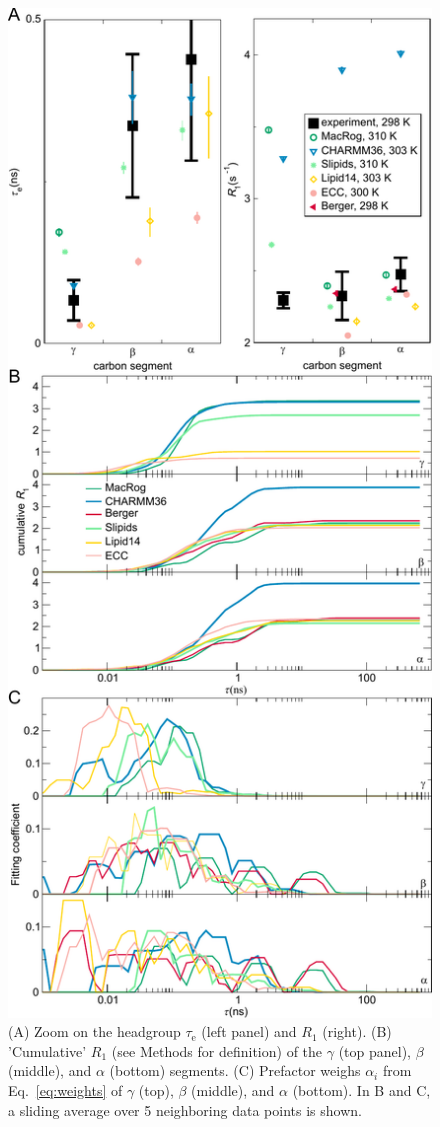 \documentclass[journal=jpcbfk,manuscript=article,layout=twocolumn]{achemso}
\begin{document}
\begin{figure}[!h]
\centering
\includegraphics[width=\columnwidth]{../Figs/R1_and_comp.pdf}
\caption{
(A) Zoom on the headgroup $\tau_\mathrm e$ (left panel) and $R_1$ (right).
(B) 'Cumulative' $R_1$ (see Methods for definition) of the
$\gamma$ (top panel), $\beta$ (middle), and $\alpha$ (bottom) segments.
(C) Prefactor weighs $\alpha_i$ from Eq.~\eqref{eq:weights} of $\gamma$ (top), $\beta$ (middle), and $\alpha$ (bottom).
In B and C, a sliding average over 5 neighboring data points is shown.
}
\label{fig:cumulativeR1s}
\end{figure}
\end{document}
